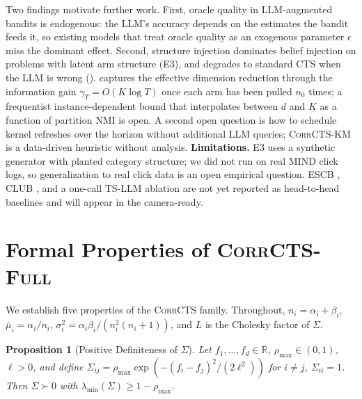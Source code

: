 \documentclass{article}
\theoremstyle{plain}
\newtheorem{proposition}[theorem]{Proposition}
\theoremstyle{definition}
\theoremstyle{remark}
\newcommand{\R}{\mathbb{R}}
\newcommand{\CorrCTS}{\textsc{CorrCTS}}
\newcommand{\CorrFull}{\textsc{CorrCTS-Full}}
\newcommand{\KMRefine}{\textsc{CorrCTS-KM}}
\begin{document}
Two findings motivate further work.
First, oracle quality in LLM-augmented bandits is endogenous: the LLM's accuracy depends on the estimates the bandit feeds it, so existing models that treat oracle quality as an exogenous parameter $\epsilon$ miss the dominant effect.
Second, structure injection dominates belief injection on problems with latent arm structure (E3), and degrades to standard CTS when the LLM is wrong ().
 captures the effective dimension reduction through the information gain $\gamma_T = O(K \log T)$ once each arm has been pulled $n_0$ times; a frequentist instance-dependent bound that interpolates between $d$ and $K$ as a function of partition NMI is open.
A second open question is how to schedule kernel refreshes over the horizon without additional LLM queries; \KMRefine{} is a data-driven heuristic without analysis.
\textbf{Limitations.} E3 uses a synthetic generator with planted category structure; we did not run on real MIND click logs, so generalization to real click data is an open empirical question.
ESCB \citep{combes2015combinatorial}, CLUB \citep{gentile2014online}, and a one-call TS-LLM ablation are not yet reported as head-to-head baselines and will appear in the camera-ready.




\newpage
\appendix
\onecolumn

\section{Formal Properties of \CorrFull}\label{app:proofs}

We establish five properties of the \CorrCTS{} family.
Throughout, $n_i = \alpha_i + \beta_i$, $\bar\mu_i = \alpha_i/n_i$, $\sigma_i^2 = \alpha_i\beta_i/(n_i^2(n_i + 1))$, and $L$ is the Cholesky factor of $\Sigma$.

\begin{proposition}[Positive Definiteness of $\Sigma$]\label{prop:pd}
Let $f_1, \ldots, f_d \in \R$, $\rho_{\max} \in (0,1)$, $\ell > 0$, and define $\Sigma_{ij} = \rho_{\max} \exp(-(f_i - f_j)^2/(2\ell^2))$ for $i \neq j$, $\Sigma_{ii} = 1$.
Then $\Sigma \succ 0$ with $\lambda_{\min}(\Sigma) \geq 1 - \rho_{\max}$.
\end{proposition}
\end{document}
